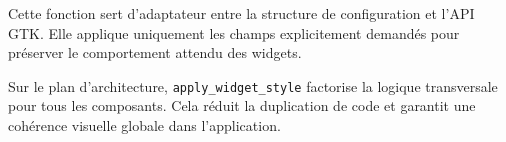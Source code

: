 Cette fonction sert d'adaptateur entre la structure de configuration et l'API GTK. Elle applique uniquement les champs explicitement demandés pour préserver le comportement attendu des widgets.

Sur le plan d'architecture, \texttt{apply\_widget\_style} factorise la logique transversale pour tous les composants. Cela réduit la duplication de code et garantit une cohérence visuelle globale dans l'application.

\newpage

